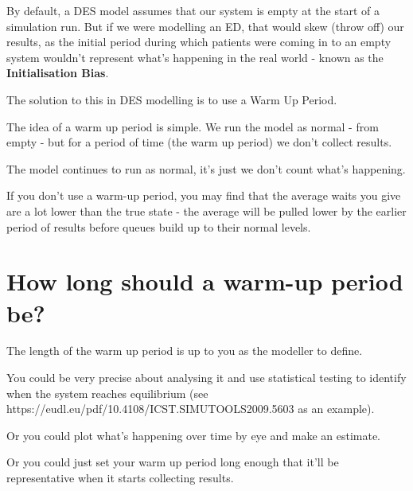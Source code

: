 \documentclass[
  letterpaper,
  DIV=11,
  numbers=noendperiod]{scrreprt}
\begin{document}
By default, a DES model assumes that our system is empty at the start of
a simulation run. But if we were modelling an ED, that would skew (throw
off) our results, as the initial period during which patients were
coming in to an empty system wouldn't represent what's happening in the
real world - known as the \textbf{Initialisation Bias}.

The solution to this in DES modelling is to use a Warm Up Period.

The idea of a warm up period is simple. We run the model as normal -
from empty - but for a period of time (the warm up period) we don't
collect results.

The model continues to run as normal, it's just we don't count what's
happening.

\begin{tcolorbox}[enhanced jigsaw, colframe=quarto-callout-warning-color-frame, bottomtitle=1mm, breakable, rightrule=.15mm, coltitle=black, colbacktitle=quarto-callout-warning-color!10!white, opacityback=0, leftrule=.75mm, arc=.35mm, toptitle=1mm, title=\textcolor{quarto-callout-warning-color}{\faExclamationTriangle}\hspace{0.5em}{Warning}, titlerule=0mm, colback=white, toprule=.15mm, bottomrule=.15mm, left=2mm, opacitybacktitle=0.6]

If you don't use a warm-up period, you may find that the average waits
you give are a lot lower than the true state - the average will be
pulled lower by the earlier period of results before queues build up to
their normal levels.

\end{tcolorbox}

\section{How long should a warm-up period
be?}\label{how-long-should-a-warm-up-period-be}

The length of the warm up period is up to you as the modeller to define.

You could be very precise about analysing it and use statistical testing
to identify when the system reaches equilibrium (see
https://eudl.eu/pdf/10.4108/ICST.SIMUTOOLS2009.5603 as an example).

Or you could plot what's happening over time by eye and make an
estimate.

Or you could just set your warm up period long enough that it'll be
representative when it starts collecting results.
\end{document}
